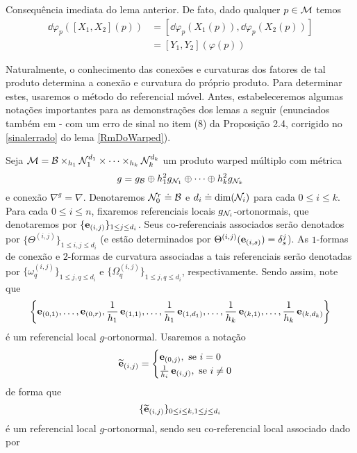 \begin{demm}
Consequência imediata do lema anterior. De fato, dado qualquer $p \in \mathcal{M}$ temos
\begin{align*}
\dd \varphi_p \left( [X_1, X_2](p) \right) &= \left[ \dd \varphi_p \left( X_1(p) \right),  \dd \varphi_p \left( X_2(p) \right) \right] \\
&= [Y_1, Y_2](\varphi(p))
\end{align*}
\end{demm}
Naturalmente, o conhecimento das conexões e curvaturas dos fatores de tal produto determina a conexão e curvatura do próprio produto. Para determinar estes, usaremos o método do referencial móvel. Antes, estabeleceremos algumas notações importantes para as demonstrações dos lemas a seguir (enunciados também em  - com um erro de sinal no item (8) da Proposição 2.4, corrigido no \cref{sinalerrado} do lema \cref{RmDoWarped}). \par 
Seja $\mathcal{M} = \mathcal{B} \times_{h_1} \mathcal{N}_1^{d_1} \times \cdots \times_{h_k} \mathcal{N}_{k}^{d_k}$ um produto warped múltiplo com métrica \[ g = g_{\mathcal{B}} \oplus h_1^2 g_{\mathcal{N}_1} \oplus \cdots \oplus h_{k}^2 g_{\mathcal{N}_k} \] e conexão $\nabla^g = \nabla$. Denotaremos $\mathcal{N}^r_0 \doteq \mathcal{B}$ e $d_i \doteq \dim(\mathcal{N}_i)$ para cada $0 \leq i \leq k$. Para cada $0 \leq i \leq n$, fixaremos referenciais locais $g_{\mathcal{N}_i}$-ortonormais, que denotaremos por $\{ \mathbf{e}_{(i, j)} \}_{1 \leq j \leq d_i}$. Seus co-referenciais associados serão denotados por $\{\Theta^{(i, j)} \}_{1 \leq i, j \leq d_i}$ (e estão determinados por $\Theta^{(i, j)}( \mathbf{e}_{(i, s)}) = \delta^j_s$). As $1$-formas de conexão e $2$-formas de curvatura associadas a tais referenciais serão denotadas por $\{ \omega^{(i, j)}_{q} \}_{1 \leq j, q \leq d_i}$ e $ \{ \Omega^{(i, j)}_{q} \}_{1 \leq j, q \leq d_i}$, respectivamente. Sendo assim, note que
\[
\left\{\mathbf{e}_{(0, 1)}, \ldots, \mathbf{e}_{(0, r)}, \frac{1}{h_1} \, \mathbf{e}_{(1, 1)}, \ldots,  \frac{1}{h_1} \, \mathbf{e}_{(1, d_1)}, \ldots, \frac{1}{h_k} \, \mathbf{e}_{(k, 1)}, \ldots,  \frac{1}{h_k} \, \mathbf{e}_{(k, d_k)} \right\}
\]
é um referencial local $g$-ortonormal. Usaremos a notação
\[
\widetilde{\mathbf{e}}_{(i, j)} = \begin{cases}
\mathbf{e}_{(0, j)}, \text{ se } i = 0 \\
\frac{1}{h_i} \, \mathbf{e}_{(i, j)}, \text{ se } i \neq 0
\end{cases}
\]
de forma que
\[
\{ \widetilde{\mathbf{e}}_{(i, j)}\}_{0 \leq i \leq k, 1 \leq j \leq d_i}
\]
é um referencial local $g$-ortonormal, sendo seu co-referencial local associado dado por
